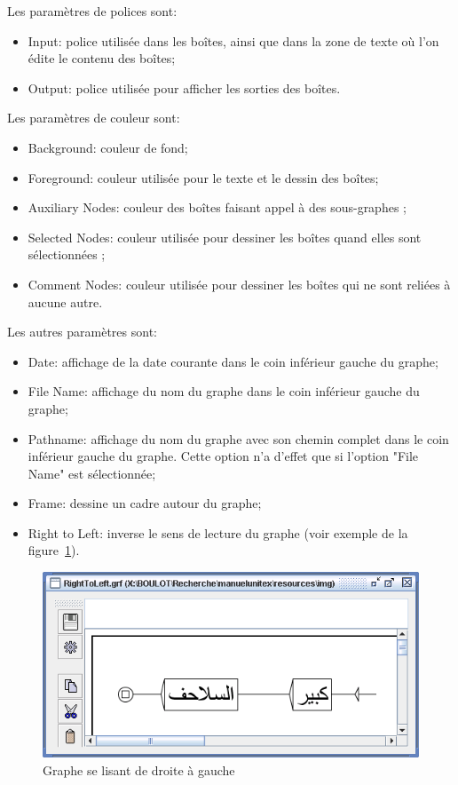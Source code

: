 \bigskip
\noindent Les paramètres de polices sont:
\begin{itemize}
  \item Input: police utilisée dans les boîtes, ainsi que dans la zone de texte où l’on édite le
contenu des boîtes;
\item Output: police utilisée pour afficher les sorties des boîtes.
\end{itemize}

\bigskip
\noindent Les paramètres de couleur sont:
\begin{itemize}
  \item Background: couleur de fond;
  \item Foreground: couleur utilisée pour le texte et le dessin des boîtes;
  \item Auxiliary Nodes: couleur des boîtes faisant appel à des sous-graphes ;
  \item Selected Nodes: couleur utilisée pour dessiner les boîtes quand elles sont sélectionnées ;
  \item Comment Nodes: couleur utilisée pour dessiner les boîtes qui ne sont reliées à aucune autre.
\end{itemize}

\bigskip
\noindent Les autres paramètres sont:
\begin{itemize}
  \item Date: affichage de la date courante dans le coin inférieur gauche du graphe;
  \item File Name: affichage du nom du graphe dans le coin inférieur gauche du graphe;
  \item Pathname: affichage du nom du graphe avec son chemin complet dans le coin inférieur
gauche du graphe. Cette option n’a d’effet que si l’option "File Name" est sélectionnée;
  \item Frame: dessine un cadre autour du graphe;
  \item Right to Left: inverse le sens de lecture du graphe (voir exemple de la
  		  figure~\ref{fig-right-to-left-graph}).
\end{itemize}

\bigskip
\begin{figure}[!h]
\begin{center}
\includegraphics[width=14.5cm]{resources/img/fig5-27.png}
\caption{Graphe se lisant de droite à gauche\label{fig-right-to-left-graph}}
\end{center}
\end{figure}

